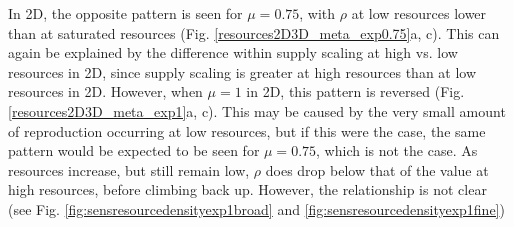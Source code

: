 \documentclass[a4paper, 11pt, hidelinks]{article} %
\begin{document}
	In 2D, the opposite pattern is seen for $ \mu = 0.75 $, with $ \rho $ at low resources lower than at saturated resources (Fig. \ref{resources2D3D_meta_exp0.75}a, c).  This can again be explained by the difference within supply scaling at high vs. low resources in 2D, since supply scaling is greater at high resources than at low resources in 2D.  However, when $ \mu = 1 $ in 2D, this pattern is reversed (Fig. \ref{resources2D3D_meta_exp1}a, c).  This may be caused by the very small amount of reproduction occurring at low resources, but if this were the case, the same pattern would be expected to be seen for $ \mu = 0.75 $, which is not the case.  As resources increase, but still remain low, $ \rho $ does drop below that of the value at high resources, before climbing back up.  However, the relationship is not clear (see Fig. \ref{fig:sensresourcedensityexp1broad} and \ref{fig:sensresourcedensityexp1fine})
	
	
\end{document}
